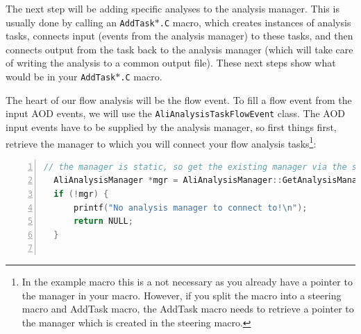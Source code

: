 \documentclass[a4paper]{book}
\numberwithin{equation}{subsection}
\begin{document}
\begin{description}
The next step will be adding specific analyses to the analysis manager. This is usually done by calling an \texttt{AddTask$\ast$.C} macro, which creates instances of analysis tasks, connects input (events from the analysis manager) to these tasks, and then connects output from the task back to the analysis manager (which will take care of writing the analysis to a common output file). These next steps show what would be in your \texttt{AddTask$\ast$.C} macro.
  
The heart of our flow analysis will be the flow event. To fill a flow event from the input AOD events, we will use the \texttt{AliAnalysisTaskFlowEvent} class. The AOD input events have to be supplied by the analysis manager, so first things first, retrieve the manager to which you will connect your flow analysis tasks\footnote{In the example macro this is a not necessary as you already have a pointer to the manager in your macro. However, if you split the macro into a steering macro and AddTask macro, the AddTask macro needs to retrieve a pointer to the manager which is created in the steering macro.}:

\begin{lstlisting}[language=C, numbers=left]
  // the manager is static, so get the existing manager via the static method
  AliAnalysisManager *mgr = AliAnalysisManager::GetAnalysisManager();
  if (!mgr) {
      printf("No analysis manager to connect to!\n");
      return NULL;
  }
        

\end{lstlisting}
\end{description}
\end{document}
